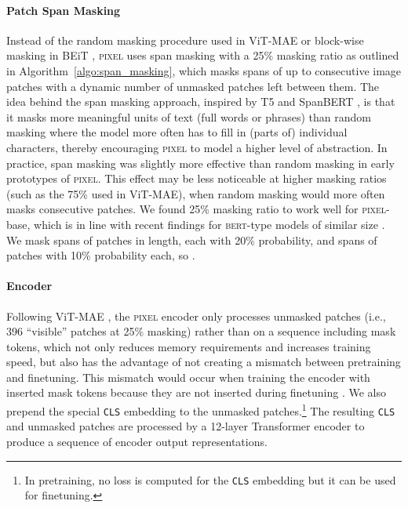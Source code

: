 \documentclass{article}
\newcommand{\model}{\textsc{pixel}\xspace}
\begin{document}
\vspace{-2mm}
\paragraph{Patch Span Masking} Instead of the random masking procedure used in ViT-MAE or block-wise masking in BEiT \citep{bao2022beit}, \model uses span masking with a 25\% masking ratio as outlined in Algorithm~\ref{algo:span_masking}, which masks spans of up to  consecutive image patches with a dynamic number of unmasked patches left between them. The idea behind the span masking approach, inspired by T5 \citep{raffel-etal-2020-t5} and SpanBERT \citep{joshi-etal-2020-spanbert}, is that it masks more meaningful units of text (full words or phrases) than random masking where the model more often has to fill in (parts of) individual characters, thereby encouraging \model to model a higher level of abstraction.
In practice, span masking was slightly more effective than random masking in early prototypes of \model. 
This effect may be less noticeable at higher masking ratios (such as the 75\% used in ViT-MAE), when random masking would more often masks consecutive patches.
We found 25\% masking ratio to work well for \model-base, which is in line with recent findings for \textsc{bert}-type models of similar size \citep{wettig-etal-2022-mask}. 
We mask spans of  patches in length, each with 20\% probability, and spans of  patches with 10\% probability each, so .


\vspace{-2mm}
\paragraph{Encoder} Following ViT-MAE \citep{he-etal-2022-mae}, the \model encoder only processes unmasked patches (i.e.,  396 ``visible'' patches at 25\% masking) rather than on a sequence including mask tokens, which not only reduces memory requirements and increases training speed, but also has the advantage of not creating a mismatch between pretraining and finetuning. This mismatch would occur when training the encoder with inserted mask tokens because they are not inserted during finetuning \citep{he-etal-2022-mae}. We also prepend the special \texttt{CLS} embedding to the unmasked patches.\footnote{In pretraining, no loss is computed for the \texttt{CLS} embedding but it can be used for finetuning.} The resulting \texttt{CLS} and unmasked patches are processed by a 12-layer Transformer encoder to produce a sequence of encoder output representations.
\end{document}
